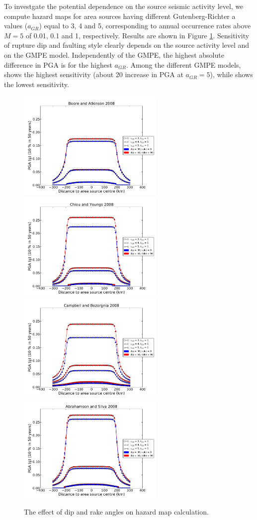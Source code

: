 To investgate the potential dependence on the source seismic activity level, we compute hazard maps for
area sources having different Gutenberg-Richter a values ($a_{GR}$) equal to 3, 4 and 5, corresponding to
annual occurrence rates above $M=5$ of 0.01, 0.1 and 1, respectively. Results are shown in Figure \ref{fig:dip_rake_area}. Sensitivity of rupture dip and faulting style clearly depends on the source activity level and on the GMPE model. Independently of the GMPE, the highest absolute difference in PGA is for the highest $a_{GR}$. Among the different GMPE models, \citet{campbell2008} shows the highest sensitivity (about 20 %
increase in PGA at $a_{GR}=5$), while \citet{boore2008} shows the lowest sensitivity.
\begin{figure}
\centering
\includegraphics[width=7cm]{./Pictures/PGA_0pt1_BA2008_dip_rake.pdf}
\includegraphics[width=7cm]{./Pictures/PGA_0pt1_CY2008_dip_rake.pdf}
\includegraphics[width=7cm]{./Pictures/PGA_0pt1_CB2008_dip_rake.pdf}
\includegraphics[width=7cm]{./Pictures/PGA_0pt1_AS2008_dip_rake.pdf}
\caption{The effect of dip and rake angles on hazard map calculation.}
\label{fig:dip_rake_area}
\end{figure}

